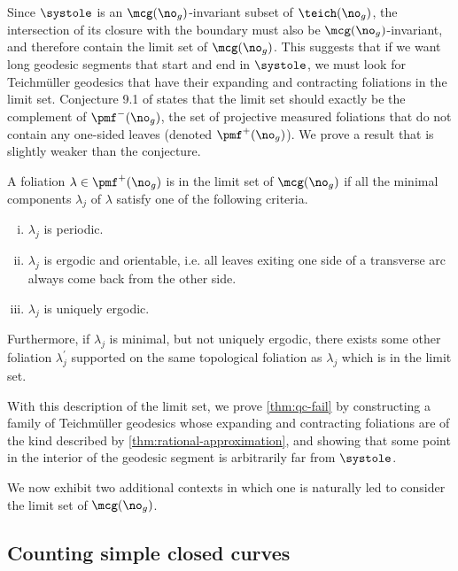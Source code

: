 \documentclass[12pt, reqno]{amsart}
\begin{document}
Since $\systole$ is an $\mcg(\no_g)$-invariant subset of $\teich(\no_g)$, the intersection of its closure with the boundary must also be $\mcg(\no_g)$-invariant, and therefore contain the limit set of $\mcg(\no_g)$.
This suggests that if we want long geodesic segments that start and end in $\systole$, we must look for Teichmüller geodesics that have their expanding and contracting foliations in the limit set.
Conjecture 9.1 of \cite{gendulphe_whats_2017} states that the limit set should exactly be the complement of $\pmf^-(\no_g)$, the set of projective measured foliations that do not contain any one-sided leaves (denoted $\pmf^+(\no_g)$).
We prove a result that is slightly weaker than the conjecture.
\begingroup
\def\thetheorem{\ref{thm:rational-approximation}}
\begin{theorem}
  A foliation $\lambda \in \pmf^+(\no_g)$ is in the limit set of $\mcg(\no_g)$ if all the minimal components $\lambda_j$ of $\lambda$ satisfy one of the following criteria.
  \begin{enumerate}[(i)]
  \item $\lambda_j$ is periodic.
  \item $\lambda_j$ is ergodic and orientable, i.e. all leaves exiting one side of a transverse arc always come back from the other side.
  \item $\lambda_j$ is uniquely ergodic.
  \end{enumerate}
  Furthermore, if $\lambda_j$ is minimal, but not uniquely ergodic, there exists some other foliation $\lambda_j^{\prime}$ supported on the same topological foliation as $\lambda_j$ which is in the limit set.
\end{theorem}
\addtocounter{theorem}{-1}
\endgroup

With this description of the limit set, we prove \autoref{thm:qc-fail} by constructing a family of Teichmüller geodesics whose expanding and contracting foliations are of the kind described by \autoref{thm:rational-approximation}, and showing that some point in the interior of the geodesic segment is arbitrarily far from $\systole$.

We now exhibit two additional contexts in which one is naturally led to consider the limit set of $\mcg(\no_g)$.

\subsection*{Counting simple closed curves}
\end{document}
